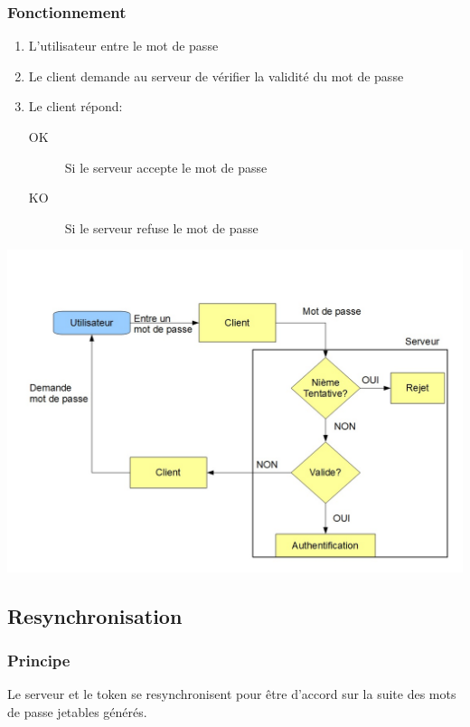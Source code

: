 \documentclass{"../../res/univ-projet"}
\begin{document}
\subsubsection{Fonctionnement}
\begin{enumerate}
    \item L'utilisateur entre le mot de passe
    \item Le client demande au serveur de vérifier la validité du
        mot de passe
    \item Le client répond:
        \begin{description}
            \item[OK] Si le serveur accepte le mot de passe
            \item[KO] Si le serveur refuse le mot de passe
        \end{description}
\end{enumerate}
\includegraphics[width=\textwidth]{../authentification.jpg}

\subsection{Resynchronisation}
\subsubsection{Principe}
Le serveur et le token se resynchronisent pour être d'accord sur la suite des
mots de passe jetables générés.
\end{document}
